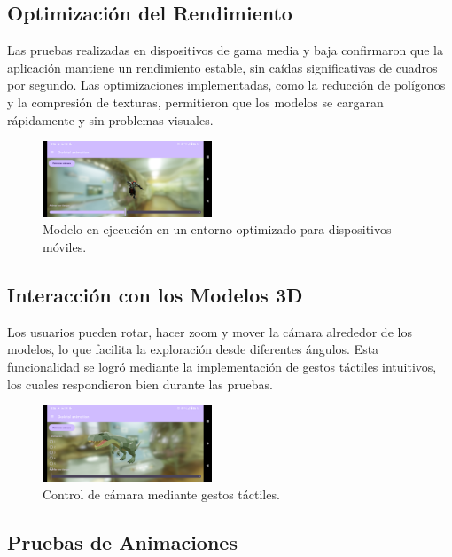 \documentclass[conference]{IEEEtran}
\begin{document}
\subsection{Optimización del Rendimiento}

Las pruebas realizadas en dispositivos de gama media y baja confirmaron que la aplicación mantiene un rendimiento estable, sin caídas significativas de cuadros por segundo. Las optimizaciones implementadas, como la reducción de polígonos y la compresión de texturas, permitieron que los modelos se cargaran rápidamente y sin problemas visuales.

\begin{figure}[H]
    \centering
    \includegraphics[width=0.45\textwidth]{img/Captura_4.png}
    \caption{Modelo en ejecución en un entorno optimizado para dispositivos móviles.}
    \label{fig:rendimiento}
\end{figure}

\subsection{Interacción con los Modelos 3D}

Los usuarios pueden rotar, hacer zoom y mover la cámara alrededor de los modelos, lo que facilita la exploración desde diferentes ángulos. Esta funcionalidad se logró mediante la implementación de gestos táctiles intuitivos, los cuales respondieron bien durante las pruebas.

\begin{figure}[H]
    \centering
    \includegraphics[width=0.45\textwidth]{img/Captura_5.png}
    \caption{Control de cámara mediante gestos táctiles.}
    \label{fig:gestos_tactiles}
\end{figure}

\subsection{Pruebas de Animaciones}
\end{document}
